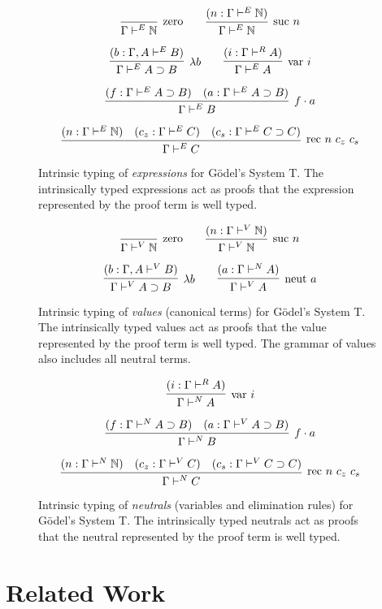 \documentclass[preprint,nonatbib]{sigplanconf}
\numberwithin{mysubdfn}{mydfn}
\def\arr{\supset}
\def\app{\cdot}
\def\lam{\lambda}
\def\nat{\mathbb{N}}
\newcommand{\con}[1]{\textmd{#1}}
\newcommand{\fun}[1]{\textmd{#1}}
\newcommand{\type}[1]{\Gamma \vdash^E #1}
\newcommand{\ctype}[2]{\Gamma , #1 \vdash^E #2}
\newcommand{\typv}[1]{\Gamma \vdash^V #1}
\newcommand{\ctypv}[2]{\Gamma , #1 \vdash^V #2}
\newcommand{\typn}[1]{\Gamma \vdash^N #1}
\newcommand{\typr}[1]{\Gamma \vdash^R #1}
\begin{document}
\begin{figure}
\caption{
Intrinsic typing of {\it expressions} for G{\"o}del's System T. The
intrinsically typed expressions act as proofs that the expression
represented by the proof term is well typed.
}
$$
\infer
  [\con{zero}]
  {\type{\nat}}
{}
\qquad
\infer
  [\con{suc} ~ n]
  {\type{\nat}}
{
  (n : \type{\nat})
}
$$

$$
\infer
  [\lam b]
  {\type{A \arr B}}
{
  (b : \ctype{A}{B})
}
\qquad
\infer
  [\fun{var} ~ i]
  {\type{A}}
{
  (i : \typr{A})
}
$$

$$
\infer
  [f \app a]
  {\type{B}}
{
  (f : \type{A \arr B})
  &
  (a : \type{A \arr B})
}
$$

$$
\infer
  [\fun{rec} ~ n ~ c_z ~ c_s]
  {\type{C}}
{
  (n : \type{\nat})
  &
  (c_z : \type{C})
  &
  (c_s : \type{C \arr C})
}
$$
\label{fig:type}
\end{figure}

\begin{figure}
\caption{
Intrinsic typing of {\it values} (canonical terms) for G{\"o}del's System T.
The intrinsically typed values act as proofs that the value
represented by the proof term is well typed. The grammar of values
also includes all neutral terms.
}
$$
\infer
  [\con{zero}]
  {\typv{\nat}}
{}
\qquad
\infer
  [\con{suc} ~ n]
  {\typv{\nat}}
{
  (n : \typv{\nat})
}
$$

$$
\infer
  [\lam b]
  {\typv{A \arr B}}
{
  (b : \ctypv{A}{B})
}
\qquad
\infer
  [\fun{neut} ~ a]
  {\typv{A}}
{
  (a : \typn{A})
}
$$
\label{fig:typv}
\end{figure}

\begin{figure}
\caption{
Intrinsic typing of {\it neutrals} (variables and elimination rules) 
for G{\"o}del's System T.
The intrinsically typed neutrals act as proofs that the neutral
represented by the proof term is well typed.
}

$$
\infer
  [\fun{var} ~ i]
  {\typn{A}}
{
  (i : \typr{A})
}
$$

$$
\infer
  [f \app a]
  {\typn{B}}
{
  (f : \typn{A \arr B})
  &
  (a : \typv{A \arr B})
}
$$

$$
\infer
  [\fun{rec} ~ n ~ c_z ~ c_s]
  {\typn{C}}
{
  (n : \typn{\nat})
  &
  (c_z : \typv{C})
  &
  (c_s : \typv{C \arr C})
}
$$
\label{fig:typn}
\end{figure}


\section{Related Work}
\end{document}
